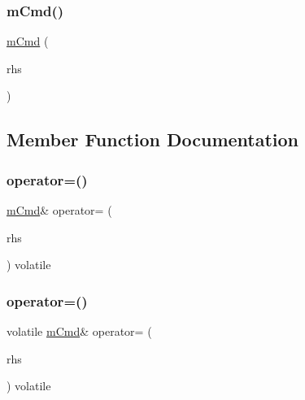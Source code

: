 \mbox{\label{structm_cmd_a390b853a14509e41006a0d873899b234}} 
\subsubsection{\texorpdfstring{mCmd()}{mCmd()}\hspace{0.1cm}{\footnotesize\ttfamily [3/3]}}
{\footnotesize\ttfamily \mbox{\hyperlink{structm_cmd}{m\+Cmd}} (\begin{DoxyParamCaption}\item[{volatile \mbox{\hyperlink{structm_cmd}{m\+Cmd}} \&}]{rhs }\end{DoxyParamCaption})\hspace{0.3cm}{\ttfamily [inline]}}



\subsection{Member Function Documentation}
\mbox{\label{structm_cmd_a861a79ec71e76fa61603073aa6969551}} 
\subsubsection{\texorpdfstring{operator=()}{operator=()}\hspace{0.1cm}{\footnotesize\ttfamily [1/2]}}
{\footnotesize\ttfamily \mbox{\hyperlink{structm_cmd}{m\+Cmd}}\& operator= (\begin{DoxyParamCaption}\item[{const volatile \mbox{\hyperlink{structm_cmd}{m\+Cmd}} \&}]{rhs }\end{DoxyParamCaption}) volatile\hspace{0.3cm}{\ttfamily [inline]}}

\mbox{\label{structm_cmd_a5a637df37056ccbe63f6fe600222c003}} 
\subsubsection{\texorpdfstring{operator=()}{operator=()}\hspace{0.1cm}{\footnotesize\ttfamily [2/2]}}
{\footnotesize\ttfamily volatile \mbox{\hyperlink{structm_cmd}{m\+Cmd}}\& operator= (\begin{DoxyParamCaption}\item[{const \mbox{\hyperlink{structm_cmd}{m\+Cmd}} \&}]{rhs }\end{DoxyParamCaption}) volatile\hspace{0.3cm}{\ttfamily [inline]}}



